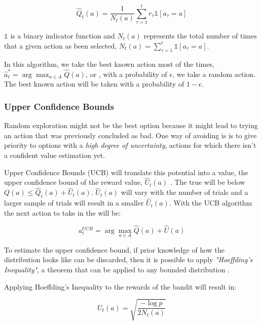 \begin{displaymath}
    \hat{Q}_t(a) = \frac{1}{N_t(a)} \sum_{\tau=1}^t r_\tau \mathds{1}[a_\tau=a]
\end{displaymath}

$\mathds{1}$ is a binary indicator function and $N_t(a)$ represents the total number of
times that a given action as been selected, $N_t(a)= \sum_{\tau=1}^t
\mathds{1}[a_\tau=a]$. 

In this algorithm, we take the best known action most of the times, $\hat{a}^*_t
= \arg \max_{a\in A}\hat{Q}(a)$, or , with a probability of $\epsilon$, we take a
random action. The best known action will be taken with a probability of
$1-\epsilon$.

\subsubsection{Upper Confidence Bounds}
Random exploration might not be the best option because it might lead to trying an
action that was previously concluded as bad. One way of avoiding is is to give
priority to options with a \textit{high degree of uncertainty}, actions for which
there isn't a confident value estimation yet.

Upper Confidence Bounds (UCB) will translate this potential into a value, the
upper confidence bound of the reward value, $\hat{U}_t(a)$ \cite{kn:Weng2018}. The
true will be below $Q(a) \leq \hat{Q}_t(a) + \hat{U}_t(a)$. $\hat{U}_t(a)$ will
vary with the number of trials and a larger sample of trials will result in a
smaller $\hat{U}_t(a)$. With the UCB algorithm the next action to take in the will be:

\begin{displaymath}
a_t^{UCB} = \arg\max_{a\in A}\hat{Q}(a) + \hat{U}(a)
\end{displaymath}

To estimate the upper confidence bound, if prior knowledge of how the distribution
looks like can be discarded, then it is possible to apply \textit{"Hoeffding's
Inequality"}, a theorem that can be applied to any bounded distribution \cite{kn:Silver}.


Applying Hoeffding's Inequality to the rewards of the bandit will result in:

\begin{displaymath}
    U_t(a) = \sqrt{\frac{-\log p}{2N_t(a)}}
\end{displaymath}

